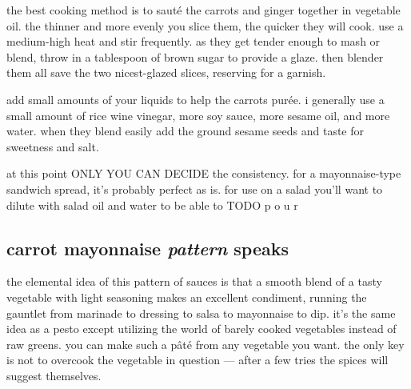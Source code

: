 the best cooking method is to saut\'{e} the carrots and ginger together in 
vegetable oil. the thinner and more evenly you slice them, the quicker they 
will cook. use a medium-high heat and stir frequently. as they get tender 
enough to mash or blend, throw in a tablespoon of brown sugar to provide a 
glaze. then blender them all save the two nicest-glazed slices, reserving for 
a garnish. 

add small amounts of your liquids to help the carrots pur\'{e}e. i generally 
use a small amount of rice wine vinegar, more soy sauce, more sesame oil, and 
more water. when they blend easily add the ground sesame seeds and taste for 
sweetness and salt.

at this point ONLY YOU CAN DECIDE the consistency. for a mayonnaise-type 
sandwich spread, it's probably perfect as is. for use on a salad you'll want 
to dilute with salad oil and water to be able to
TODO
p
  o
   u
   r

\subsection{carrot mayonnaise \textit{pattern} speaks}

the elemental idea of this pattern of sauces is that a smooth blend of a tasty 
vegetable with light seasoning makes an excellent condiment, running the 
gauntlet from marinade to dressing to salsa to mayonnaise to dip. it's the 
same idea as a pesto except utilizing the world of barely cooked vegetables 
instead of raw greens. you can make such a p\^{a}t\'{e} from any vegetable you 
want. the only key is not to overcook the vegetable in question --- after a 
few tries the spices will suggest themselves.

